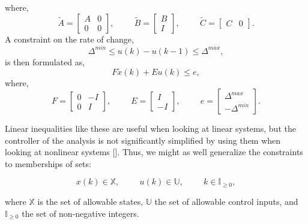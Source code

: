 where,
\begin{equation}
\tilde{A} = \left[ \begin{array}{cc}
A & 0\\ 0 & 0
\end{array} \right],
\hspace{1cm}
\tilde{B} = \left[\begin{array}{cc}
B \\ I
\end{array} \right],
\hspace{1cm}
\tilde{C} = \left[\begin{array}{cc}
C & 0
\end{array}\right].
\end{equation}
A constraint on the rate of change,
\begin{equation}
\Delta^{min} \leq u(k) - u(k-1) \leq \Delta^{max},
\end{equation}
is then formulated as,
\begin{equation}
	F\tilde{x}(k) + Eu(k)\leq e,
\end{equation}
where,
\begin{equation}
F = \left[ \begin{array}{cc}
0 & -I\\ 0 & I
\end{array} \right],
\hspace{1cm}
E = \left[\begin{array}{cc}
I \\ -I
\end{array} \right],
\hspace{1cm}
e = \left[\begin{array}{cc}
\Delta^{max} \\ -\Delta^{min}
\end{array}\right].
\end{equation}

Linear inequalities like these are useful when looking at linear systems, but the controller of the analysis is not significantly simplified by using them when looking at nonlinear systems [\citeauthor{Rawlings2012}]. Thus, we might as well generalize the constraints to memberships of sets:

\begin{equation}
x(k) \in \mathbb{X}, \hspace{1cm} u(k) \in \mathbb{U}, \hspace{1cm} k \in \mathbb{I}_{\geq 0},
\end{equation}

where $\mathbb{X}$ is the set of allowable states, $\mathbb{U}$ the set of allowable control inputs, and $\mathbb{I}_{\geq 0}$ the set of non-negative integers. 

